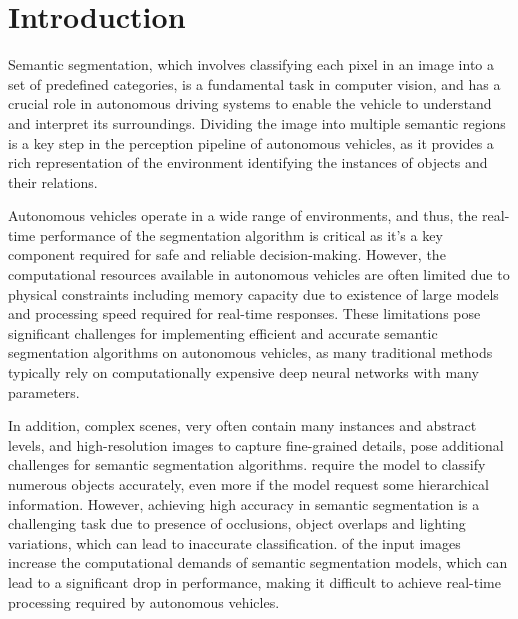 \section{Introduction}

  Semantic segmentation, which involves classifying each pixel in an image
  into a set of predefined categories, is a fundamental task in computer
  vision\cite{intelligence2021modern, goodfellow2016deep}, and has a crucial
  role in autonomous driving systems to enable the vehicle
  to understand and interpret its surroundings\cite{Geiger2012CVPR}. Dividing the image into multiple
  semantic regions is a key step in the perception pipeline of autonomous vehicles,
  as it provides a rich representation of the environment identifying the instances
  of objects and their relations\cite{Geiger2012CVPR, xiao2018unified}.


  Autonomous vehicles operate in a wide range of environments, and thus, the real-time
  performance of the segmentation algorithm is critical as it's a key component required
  for safe and reliable decision-making\cite{Geiger2012CVPR, cortinhal2020salsanext}. However, the computational resources available
  in autonomous vehicles are often limited due to physical constraints including memory capacity
  due to existence of large models and processing speed required for real-time responses\cite{cortinhal2020salsanext}.
  These limitations pose significant challenges for implementing efficient and accurate
  semantic segmentation algorithms on autonomous vehicles, as many traditional methods typically
  rely on computationally expensive deep neural networks with many parameters.

  In addition, complex scenes, very often contain many instances and abstract
  levels, and high-resolution images to capture fine-grained details, pose
  additional challenges for semantic segmentation algorithms\cite{intelligence2021modern, goodfellow2016deep}.
   require the model to classify numerous objects accurately, even more
  if the model request some hierarchical information\cite{li2022deep}. However, achieving
  high accuracy in semantic segmentation is a challenging task due to presence of occlusions,
  object overlaps and lighting variations, which can lead to inaccurate classification\cite{cortinhal2020salsanext}. 
  of the input images increase the computational demands of semantic segmentation models, which
  can lead to a significant drop in performance, making it difficult to achieve real-time processing
  required by autonomous vehicles\cite{intelligence2021modern, Geiger2012CVPR}.

